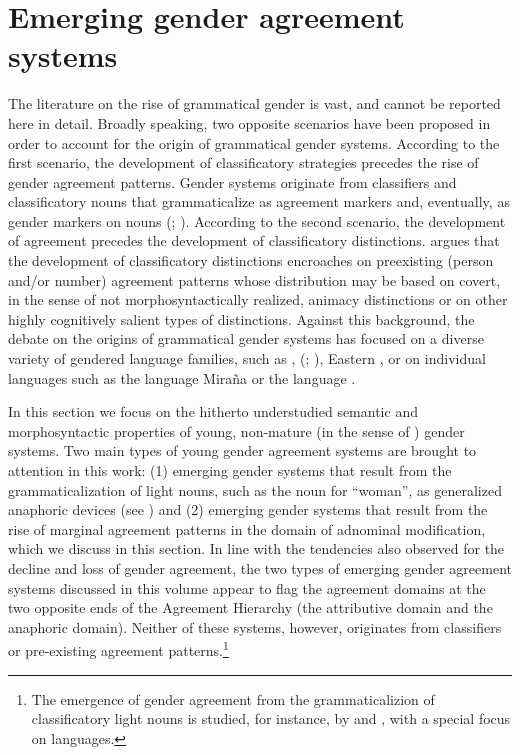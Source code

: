 \documentclass[output=collectionpaper]{langsci/langscibook}
\begin{document}
\section{Emerging gender agreement systems}
\label{subsec:emerging}
The literature on the rise of grammatical gender is vast, and cannot be reported here in detail. Broadly speaking, two opposite scenarios have been proposed in order to account for the origin of grammatical gender systems. According to the first scenario, the development of classificatory strategies precedes the rise of gender agreement patterns. Gender systems originate from classifiers and classificatory nouns that grammaticalize as agreement markers and, eventually, as gender markers on nouns (\citealt{Greenberg1978}; \citealt{Corbett1991}).
According to the second scenario, the development of agreement precedes the development of classificatory distinctions.  \citet[139--142]{Nichols1992} argues that the development of classificatory distinctions encroaches on preexisting (person and/or number) agreement patterns whose distribution may be based on covert, in the sense of not morphosyntactically realized, animacy distinctions or on other highly cognitively salient types of distinctions.
Against this background, the debate on the origins of grammatical gender systems has focused on a diverse variety of gendered language families, such as  \citep{Matasovic2004,Luraghi2011},  (\citealt{Greenberg1978}; \citealt{Williamson1994}), Eastern  \citep{Heine1983}, or on individual languages such as the  language Mira\~{n}a \citep{Seifart2005} or the  language  \citep{Reid1997}.

In this section we focus on the hitherto understudied semantic and morphosyntactic properties of young, non-mature (in the sense of \citealt{Dahl2004}) gender systems. Two main types of young gender agreement systems are brought to attention in this work: 
(1) emerging gender systems that result from the grammaticalization of light nouns, such as the noun for ``woman'', as generalized anaphoric devices (see ) and 
(2) emerging gender systems that result from the rise of marginal agreement patterns in the domain of adnominal modification, which we discuss in this section. In line with the tendencies also observed for the decline and loss of gender agreement, the two types of emerging gender agreement systems discussed in this volume appear to flag the agreement domains at the two opposite ends of the Agreement Hierarchy (the attributive domain and the anaphoric domain). Neither of these systems, however, originates from classifiers or pre-existing agreement patterns.\footnote{The emergence of gender agreement from the grammaticalizion of classificatory light nouns is studied, for instance, by \citet{Grinevald2004} and \cite{Seifart2005}, with a special focus on  languages.}
\end{document}

